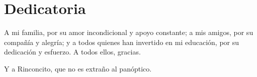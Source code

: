 \chapter*{Dedicatoria}


A mi familia, por su amor incondicional y apoyo constante; 
a mis amigos, por su compañía y alegría; 
y a todos quienes han invertido en mi educación, por su dedicación y esfuerzo. 
A todos ellos, gracias.

Y a Rinconcito, que no es extraño al panóptico.